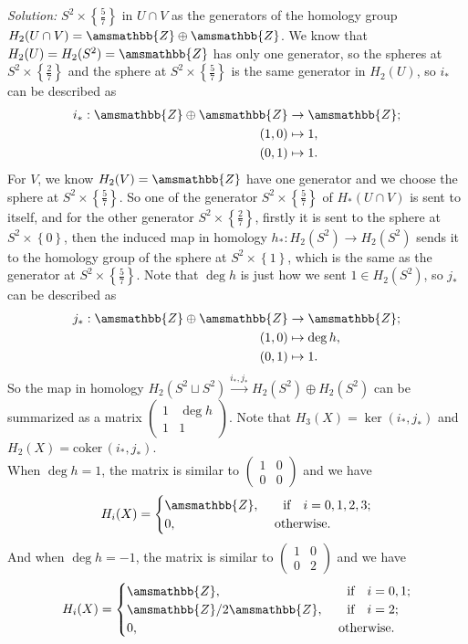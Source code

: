 \documentclass[letterpaper, 12pt]{article}
\newenvironment{solution}
		{\textit{Solution:}}
		{}
\renewcommand{\mathbb}{\amsmathbb}
\newcommand{\iif}{\ \ \ \text{if}\ \ \ }
\newcommand{\otherwise}{\text{otherwise}}
\newcommand{\coker}{\text{coker}\,}
\begin{document}
\begin{solution}
\(S^2\times \left\{ \frac{5}{7} \right\}\) in \(U\cap V\) as the generators of the homology group \(H_2(U\cap V)=\mathbb{Z}\oplus \mathbb{Z}\). We know that \(H_2(U)=H_2(S^2)=\mathbb{Z}\) has only one generator, so the spheres at \(S^2\times \left\{  \frac{2}{7}\right\}\) and the sphere 
at \(S^2\times \left\{ \frac{5}{7} \right\}\) is the same generator in \(H_2(U)\), so \(i_*\) can be described as 
\begin{align*}
    i_*:\mathbb{Z}\oplus \mathbb{Z}&\rightarrow \mathbb{Z};\\ 
        (1,0)&\mapsto 1,\\ 
        (0,1)&\mapsto 1.
\end{align*}
For \(V\), we know \(H_2(V)=\mathbb{Z}\) have one generator and we choose the sphere at \(S^2\times \left\{ \frac{5}{7} \right\}\). So one of the generator \(S^2\times \left\{ \frac{5}{7} \right\}\) of \(H_*(U\cap V)\) is sent to itself, and for the other generator \(S^2\times \left\{ \frac{2}{7} \right\}\), firstly it is sent to the sphere at 
\(S^2\times \left\{ 0 \right\}\), then the induced map in homology \(h_*:H_2(S^2)\rightarrow H_2(S^2)\) sends it to the homology group of the sphere at \(S^2\times \left\{ 1 \right\}\), which is the same as the generator at \(S^2\times \left\{ \frac{5}{7} \right\}\). Note that 
\(\deg h\) is just how we sent \(1\in H_2(S^2)\), so \(j_*\) can be described as 
\begin{align*}
    j_*:\mathbb{Z}\oplus \mathbb{Z}&\rightarrow \mathbb{Z};\\ 
    (1,0)&\mapsto \deg h,\\ 
    (0,1)&\mapsto 1.
\end{align*}
So the map in homology \(H_2(S^2\sqcup S^2)\xrightarrow{i_*,j_*}H_2(S^2)\oplus H_2(S^2)\) can be summarized as a matrix \(\begin{pmatrix}
    1&\deg h\\ 
    1&1
\end{pmatrix}\). Note that \(H_3(X)=\ker (i_*,j_*)\) and \(H_2(X)=\coker (i_*,j_*)\).\\ 
When \(\deg h=1\), the matrix is similar to \(\begin{pmatrix}
    1&0\\ 
    0&0
\end{pmatrix}\) and we have 
\[H_i(X)=\begin{cases}
    \mathbb{Z},&\iif i=0,1,2,3;\\ 
    0,&\ \otherwise.
\end{cases}\]
And when \(\deg h=-1\), the matrix is similar to \(\begin{pmatrix}
    1&0\\ 
    0&2
\end{pmatrix}\) and we have 
\[H_i(X)=\begin{cases}
    \mathbb{Z},&\iif i=0,1;\\ 
    \mathbb{Z}/2 \mathbb{Z},&\iif i=2;\\
    0,&\ \otherwise.
\end{cases}\]
\end{solution}
\end{document}
